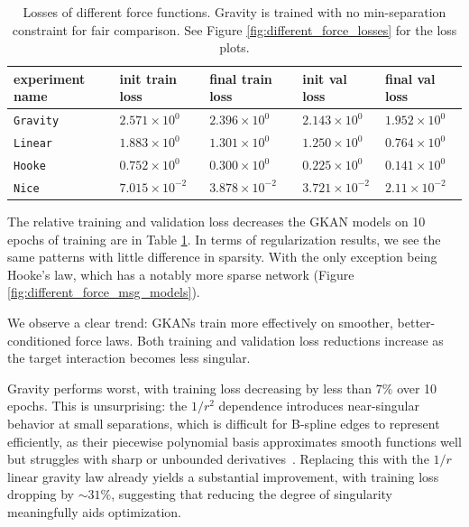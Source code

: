 \documentclass{article}
\begin{document}
\begin{table}
\centering
\caption{Losses of different force functions. Gravity is trained with no min-separation constraint for fair comparison. See Figure \ref{fig:different_force_losses} for the loss plots.}
\vspace{0.2em}
    \begin{tabular}{l|l|l|l|l}
    \hline
    experiment name & init train loss & final train loss & init val loss & final val loss\\
    \hline
    \texttt{Gravity} & $2.571 \times 10^{0}$ & $2.396 \times 10^{0}$ & $2.143 \times 10^{0}$ & $1.952 \times 10^{0}$\\
    \texttt{Linear} & $1.883 \times 10^{0}$ & $1.301 \times 10^{0}$ & $1.250 \times 10^{0}$ & $0.764 \times 10^{0}$\\
    \texttt{Hooke} & $0.752 \times 10^{0}$ & $0.300 \times 10^{0}$ & $0.225 \times 10^{0}$ & $0.141 \times 10^{0}$\\
    \texttt{Nice} & $7.015 \times 10^{-2}$ & $3.878 \times 10^{-2}$ & $3.721 \times 10^{-2}$ & $2.11\times 10^{-2}$\\
    \hline
    \end{tabular}
    \label{tab:results-different-force}
\end{table}
The relative training and validation loss decreases the GKAN models on 10 epochs of training are in Table \ref{tab:results-different-force}. In terms of regularization results, we see the same patterns with little difference in sparsity. With the only exception being Hooke's law, which has a notably more sparse network (Figure \ref{fig:different_force_msg_models}).

We observe a clear trend: GKANs train more effectively on smoother, better-conditioned force laws. Both training and validation loss reductions increase as the target interaction becomes less singular.

Gravity performs worst, with training loss decreasing by less than $7\%$ over 10 epochs. This is unsurprising: the $1/r^2$ dependence introduces near-singular behavior at small separations, which is difficult for B-spline edges to represent efficiently, as their piecewise polynomial basis approximates smooth functions well but struggles with sharp or unbounded derivatives~\parencite{DEBOOR197250}. Replacing this with the $1/r$ linear gravity law already yields a substantial improvement, with training loss dropping by $\sim 31\%$, suggesting that reducing the degree of singularity meaningfully aids optimization.
\end{document}
